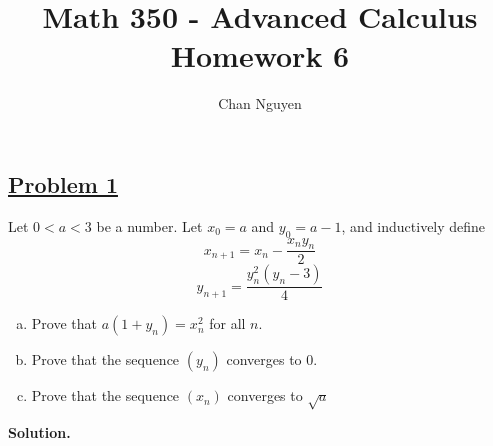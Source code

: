 \documentclass[10pt,letterpaper]{article}
\title{\textbf{Math 350 - Advanced Calculus \\ Homework 6}}
\author{Chan Nguyen}
\begin{document}
\tableofcontents 
\maketitle

\setlength{\parindent}{0pt}
\setlength{\parskip}{1ex}
	\subsection*{{\color{purple}\underline{Problem 1}}}
	Let $0 < a < 3$ be a number. Let $x_0 = a$ and $y_0 = a - 1$, and inductively define
	$$x_{n+1} = x_n - \dfrac{x_ny_n}{2}$$
	$$y_{n+1} = \dfrac{y_n^2(y_n - 3)}{4}$$
	\begin{enumerate}[(a)]
		\item Prove that $a(1 + y_n) = x_n^2$ for all $n$.
		\item Prove that the sequence $(y_n)$ converges to $0$.
		\item Prove that the sequence $(x_n)$ converges to $\sqrt{a}$
	\end{enumerate}
	\textbf{Solution. }
\end{document}
